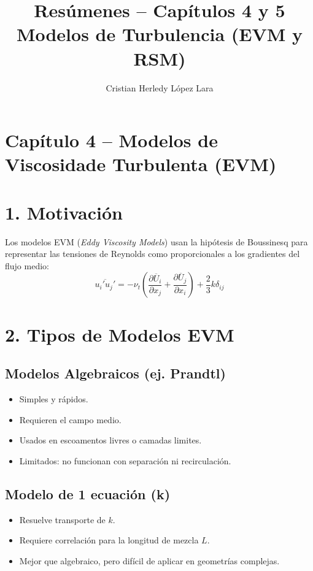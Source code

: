 \documentclass[a4paper,12pt]{article}
\title{Resúmenes – Capítulos 4 y 5\\Modelos de Turbulencia (EVM y RSM)}
\author{Cristian Herledy López Lara}
\date{}
\begin{document}
	\maketitle
	
	\section*{Capítulo 4 – Modelos de Viscosidade Turbulenta (EVM)}
	
	\section*{1. Motivación}
	Los modelos EVM (\textit{Eddy Viscosity Models}) usan la hipótesis de Boussinesq para representar las tensiones de Reynolds como proporcionales a los gradientes del flujo medio:
	\[
	\overline{u_i' u_j'} = -\nu_t \left( \frac{\partial \overline{U}_i}{\partial x_j} + \frac{\partial \overline{U}_j}{\partial x_i} \right) + \frac{2}{3}k\delta_{ij}
	\]
	
	\section*{2. Tipos de Modelos EVM}
	
	\subsection*{Modelos Algebraicos (ej. Prandtl)}
	\begin{itemize}
		\item Simples y rápidos.
		\item Requieren el campo medio.
		\item Usados en escoamentos livres o camadas limites.
		\item Limitados: no funcionan con separación ni recirculación.
	\end{itemize}
	
	\subsection*{Modelo de 1 ecuación (k)}
	\begin{itemize}
		\item Resuelve transporte de $k$.
		\item Requiere correlación para la longitud de mezcla $L$.
		\item Mejor que algebraico, pero difícil de aplicar en geometrías complejas.
	\end{itemize}
	
\end{document}
